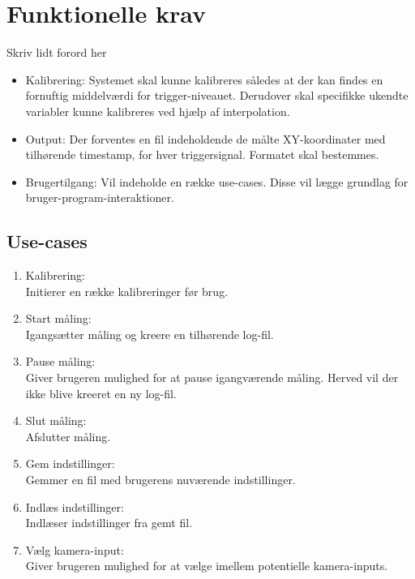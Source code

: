 \documentclass[kravspec.tex]{subfiles}
\begin{document}
\section{Funktionelle krav}
Skriv lidt forord her \\
\begin{itemize}
	\item 
	Kalibrering: Systemet skal kunne kalibreres således at der kan findes en fornuftig middelværdi for trigger-niveauet. Derudover skal specifikke ukendte variabler kunne kalibreres ved hjælp af interpolation.  
	\item
	Output: Der forventes en fil indeholdende de målte XY-koordinater med tilhørende timestamp, for hver triggersignal. Formatet skal bestemmes.
	\item
	Brugertilgang: Vil indeholde en række use-cases. Disse vil lægge grundlag for bruger-program-interaktioner.
\end{itemize}

\subsection{Use-cases}	
\begin{enumerate}
	\item Kalibrering: \\Initierer en række kalibreringer før brug. 
	\item Start måling: \\Igangsætter måling og kreere en tilhørende log-fil.
	\item Pause måling: \\Giver brugeren mulighed for at pause igangværende måling. Herved vil der ikke blive kreeret en ny log-fil. 
	\item Slut måling: \\Afslutter måling.
	\item Gem indstillinger: \\Gemmer en fil med brugerens nuværende indstillinger.
	\item Indlæs indstillinger: \\Indlæser indstillinger fra gemt fil.
	\item Vælg kamera-input: \\ Giver brugeren mulighed for at vælge imellem potentielle kamera-inputs.

\end{enumerate}
	
\end{document}
